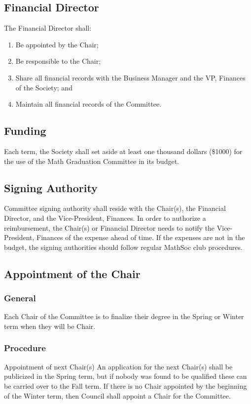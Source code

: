 \subsection{Financial Director}
The Financial Director shall:
\begin{enumerate}
\item Be appointed by the Chair;
\item Be responsible to the Chair;
\item Share all financial records with the Business Manager and the VP, Finances of 
the Society; and
\item Maintain all financial records of the Committee.
\end{enumerate}

\subsection{Funding}
Each term, the Society shall set aside at least one thousand dollars (\$1000) for the use of the Math Graduation Committee in its budget.

\subsection{Signing Authority}
Committee signing authority shall reside with the Chair(s), the Financial Director, 
and the Vice-President, Finances. In order to authorize a reimbursement, the Chair(s) 
or Financial Director needs to notify the Vice-President, Finances of the expense 
ahead of time. If the expenses are not in the budget, the signing authorities should 
follow regular MathSoc club procedures. 

\subsection{Appointment of the Chair}
\subsubsection{General}
Each Chair of the Committee is to finalize their degree in the Spring or Winter term 
when they will be Chair.

\subsubsection{Procedure}
\item Appointment of next Chair(s)
An application for the next Chair(s) shall be publicized in the Spring term, but if 
nobody was found to be qualified these can be carried over to the Fall term. If there 
is no Chair appointed by the beginning of the Winter term, then Council shall appoint 
a Chair for the Committee.

